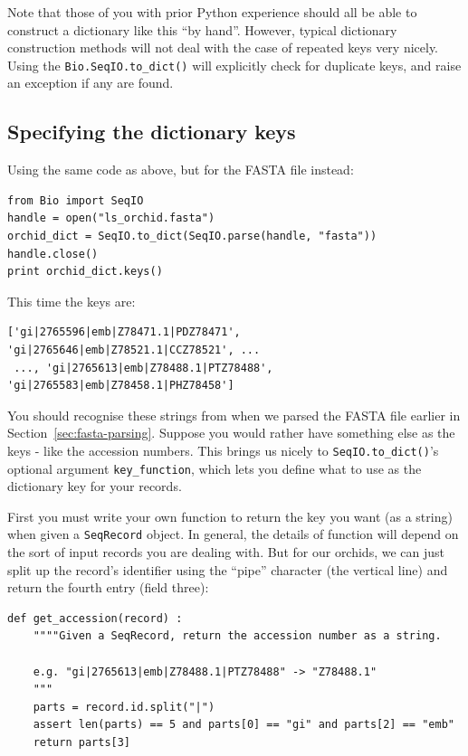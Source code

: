 \documentclass{report}
\begin{document}
Note that those of you with prior Python experience should all be able to construct a dictionary like this ``by hand''.  However, typical dictionary construction methods will not deal with the case of repeated keys very nicely.  Using the \verb|Bio.SeqIO.to_dict()| will explicitly check for duplicate keys, and raise an exception if any are found.

\subsection{Specifying the dictionary keys}
\label{seq:seqio-todict-functionkey}

Using the same code as above, but for the FASTA file instead:

\begin{verbatim}
from Bio import SeqIO
handle = open("ls_orchid.fasta")
orchid_dict = SeqIO.to_dict(SeqIO.parse(handle, "fasta"))
handle.close()
print orchid_dict.keys()
\end{verbatim}

\noindent This time the keys are:

\begin{verbatim}
['gi|2765596|emb|Z78471.1|PDZ78471', 'gi|2765646|emb|Z78521.1|CCZ78521', ...
 ..., 'gi|2765613|emb|Z78488.1|PTZ78488', 'gi|2765583|emb|Z78458.1|PHZ78458']
\end{verbatim}

You should recognise these strings from when we parsed the FASTA file earlier in Section~\ref{sec:fasta-parsing}.  Suppose you would rather have something else as the keys - like the accession numbers.  This brings us nicely to \verb|SeqIO.to_dict()|'s optional argument \verb|key_function|, which lets you define what to use as the dictionary key for your records.

First you must write your own function to return the key you want (as a string) when given a \verb|SeqRecord| object.  In general, the details of function will depend on the sort of input records you are dealing with.  But for our orchids, we can just split up the record's identifier using the ``pipe'' character (the vertical line) and return the fourth entry (field three):

\begin{verbatim}
def get_accession(record) :
    """"Given a SeqRecord, return the accession number as a string.
  
    e.g. "gi|2765613|emb|Z78488.1|PTZ78488" -> "Z78488.1"
    """
    parts = record.id.split("|")
    assert len(parts) == 5 and parts[0] == "gi" and parts[2] == "emb"
    return parts[3]
\end{verbatim}
\end{document}
